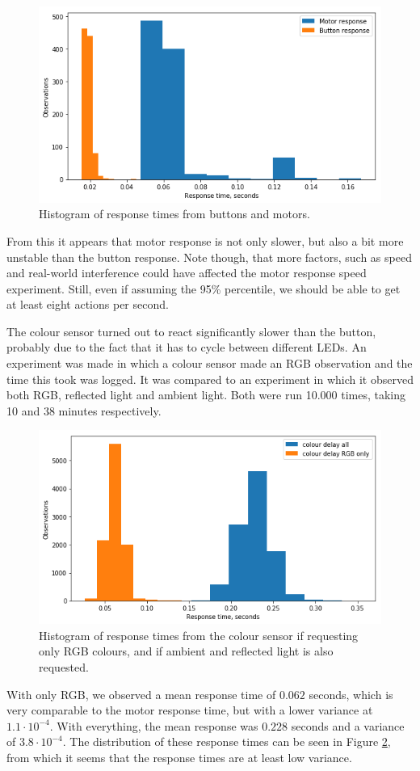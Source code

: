 \documentclass[11pt, a4paper]{article}
\begin{document}
	\begin{figure}[H]
		\centering
		\includegraphics[width=0.6\linewidth]{images/motor_button_response_histogram.png}	
		\caption{Histogram of  response times from buttons and motors.}
		\label{fig:responsetimemotorbutt}
	\end{figure} 
	From this it appears that motor response is not only slower, but also a bit more unstable than the button response. Note though, that more factors, such as speed and real-world interference could have affected the motor response speed experiment. Still, even if assuming the 95\% percentile, we should be able to get at least eight actions per second. 
	
	The colour sensor turned out to react significantly slower than the button, probably due to the fact that it has to cycle between different LEDs. An experiment was made in which a colour sensor made an RGB observation and the time this took was logged. It was compared to an experiment in which it observed both RGB, reflected light and ambient light. Both were run 10.000 times, taking 10 and 38 minutes respectively.
	
	\begin{figure}[H]
		\centering
		\includegraphics[width=0.6\linewidth]{images/colour_response_histogram.png} 	
		\caption{Histogram of  response times from the colour sensor if requesting only RGB colours, and if ambient and reflected light is also requested.}
		\label{fig:responsetimecolour}
	\end{figure}
	With only RGB, we observed a mean response time of $0.062$ seconds, which is very comparable to the motor response time, but with a lower variance at $1.1\cdot 10^{-4}$. With everything, the mean response was $0.228$ seconds and a variance of $3.8 \cdot 10^{-4}$. The distribution of these response times can be seen in Figure \ref{fig:responsetimecolour}, from which it seems that the response times are at least low variance.
	
\end{document}
